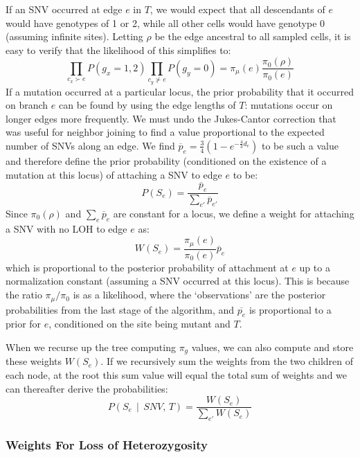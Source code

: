 \documentclass[../../main.tex]{subfiles}
\begin{document}
If an SNV occurred at edge $e$ in $T$, we would expect that all descendants of $e$ would have genotypes of 1 or 2, while all other cells would have genotype 0 (assuming infinite sites).
Letting $\rho$ be the edge ancestral to all sampled cells, it is easy to verify that the likelihood of this simplifies to:
\begin{equation*}
    \prod_{c_x\succ e}P(g_x =1,2)\prod_{c_y\nsucc e} P(g_y = 0) = \pi_\mu(e)\frac{\pi_0(\rho)}{\pi_0(e)}
\end{equation*}
If a mutation occurred at a particular locus, the prior probability that it occurred on branch $e$ can be found by using the edge lengths of $T$: mutations occur on longer edges more frequently.
We must undo the Jukes-Cantor correction that was useful for neighbor joining to find a value proportional to the expected number of SNVs along an edge.
We find $\overline{p}_e = \frac{3}{4}\left(1-e^{-\frac{4}{3}d_e}\right)$ to be such a value and therefore define the prior probability (conditioned on the existence of a mutation at this locus) of attaching a SNV to edge $e$ to be:
\begin{equation*}
    P(S_e) = \frac{\overline{p}_e}{\sum_{e'}\overline{p}_{e'}}
\end{equation*}
Since $\pi_0(\rho)$ and $\sum_{e}\overline{p}_{e}$ are constant for a locus, we define a weight for attaching a SNV with no LOH to edge $e$ as:
\begin{equation*}
    W(S_e) = \frac{\pi_\mu(e)}{\pi_0(e)} \overline{p}_e
\end{equation*}
which is proportional to the posterior probability of attachment at $e$ up to a normalization constant (assuming a SNV occurred at this locus).
This is because the ratio $\pi_\mu/\pi_0$ is as a likelihood, where the `observations' are the posterior probabilities from the last stage of the algorithm, and $\overline{p_e}$ is proportional to a prior for $e$, conditioned on the site being mutant and $T$.

When we recurse up the tree computing $\pi_g$ values, we can also compute and store these weights $W(S_e)$.
If we recursively sum the weights from the two children of each node, at the root this sum value will equal the total sum of weights and we can thereafter derive the probabilities:
\begin{equation} \label{eq:SNVattachP}
    P(S_e\,\mid\,SNV,\,T) = \frac{W(S_e)}{\sum_{e'}W(S_e)}
\end{equation}


\subsubsection*{Weights For Loss of Heterozygosity}
\end{document}
